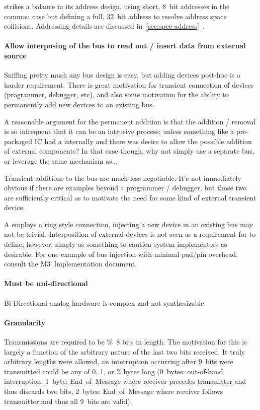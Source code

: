 \bus strikes a balance in its address design, using short, 8~bit addresses in
the common case but defining a full, 32~bit address to resolve address space
collisions. Addressing details are discussed
in~\ref{sec:spec-address}~.

\paragraph{Allow interposing of the bus to read out / insert data from
external source}
Sniffing pretty much any bus design is easy, but adding devices post-hoc is a
harder requirement. There is great motivation for transient connection of
devices (programmer, debugger, etc), and also some motivation for the ability
to permanently add new devices to an existing bus.

A reasonable argument for the permanent addition is that the addition /
removal is so infrequent that it can be an intrusive process; unless something
like a pre-packaged IC had a \bus internally and there was desire to allow the
possible addition of external components? In that case though, why not simply
use a separate bus, or leverage the same mechanism as...

Transient additions to the bus are much less negotiable. It's not immediately
obvious if there are examples beyond a programmer / debugger, but those two
are sufficiently critical as to motivate the need for some kind of external
transient device.

A \bus employs a ring style connection, injecting a new device in an existing
bus may not be trivial. Interposition of external devices is not seen as a
requirement for \bus to define, however, simply as something to caution system
implementors as desirable. For one example of bus injection with minimal
pad/pin overhead, consult the M3~Implementation document.

\paragraph{Must be uni-directional}
Bi-Directional analog hardware is complex and not synthesizable.

\paragraph{Granularity}
\label{sec:design-granularity}
Transmissions are required to be \%~8 bits in length. The motivation for this
is largely a function of the arbitrary nature of the last two bits
received. It truly arbitrary lengths were allowed, an interruption occurring
after 9~bits were transmitted could be any of 0, 1, or 2~bytes long
(0~bytes: out-of-band interruption, 1~byte: End~of~Message where receiver
precedes transmitter and thus discards two bits, 2~bytes: End~of~Message where
receiver follows transmitter and thus all 9~bits are valid).

